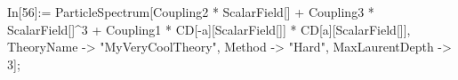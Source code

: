 In[56]:= ParticleSpectrum[Coupling2 * ScalarField[] + Coupling3 * ScalarField[]^3 + Coupling1 * CD[-a][ScalarField[]] * CD[a][ScalarField[]], TheoryName -> "MyVeryCoolTheory", Method -> "Hard", MaxLaurentDepth -> 3]; 